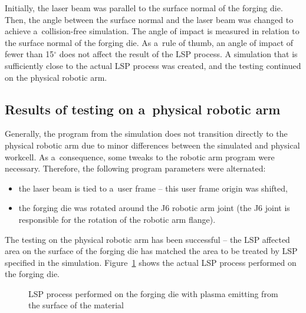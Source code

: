Initially, the laser beam was parallel to the surface normal of the forging die. Then, the angle between the surface normal and the laser beam was changed to achieve a~collision-free simulation. The angle of impact is measured in relation to the surface normal of the forging die. As a~rule of thumb, an angle of impact of fewer than 15$^{\circ}$ does not affect the result of the LSP process.  A simulation that is sufficiently close to the actual LSP process was created, and the testing continued on the physical robotic arm.

\subsection{Results of testing on a~physical robotic arm}

Generally, the program from the simulation does not transition directly to the physical robotic arm due to minor differences between the simulated and physical workcell.  As a~consequence, some tweaks to the robotic arm program were necessary. Therefore, the following program parameters were alternated:

\begin{itemize}

\item the laser beam is tied to a~user frame -- this user frame origin was shifted,

\item the forging die was rotated around the J6 robotic arm joint (the J6 joint is responsible for the rotation of the robotic arm flange).
 
\end{itemize}
The testing on the physical robotic arm has been successful -- the LSP affected area on the surface of the forging die has matched the area to be treated by LSP specified in the simulation. Figure~\ref{fig:peening} shows the actual LSP process performed on the forging die. 

\begin{figure}[h]
    \centering
    \noindent{}
    \caption[LSP process performed on the forging die]{LSP process performed on the forging die with plasma emitting from the surface of the material}
    \label{fig:peening}
\end{figure}



